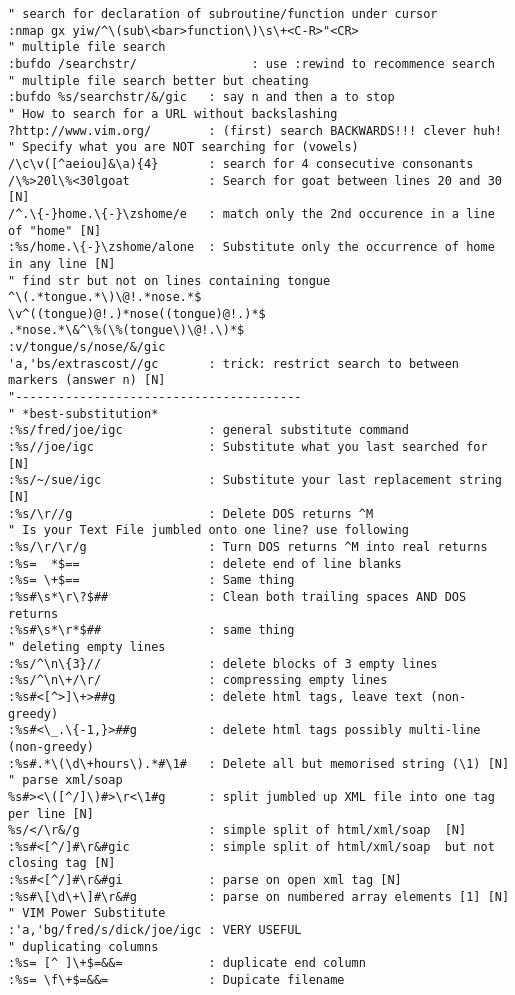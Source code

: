 \documentclass[10pt,landscape]{article}
\begin{document}
\begin{multicols}{2}
\begin{verbatim}
" search for declaration of subroutine/function under cursor
:nmap gx yiw/^\(sub\<bar>function\)\s\+<C-R>"<CR>
" multiple file search
:bufdo /searchstr/                : use :rewind to recommence search
" multiple file search better but cheating
:bufdo %s/searchstr/&/gic   : say n and then a to stop
" How to search for a URL without backslashing
?http://www.vim.org/        : (first) search BACKWARDS!!! clever huh!
" Specify what you are NOT searching for (vowels)
/\c\v([^aeiou]&\a){4}       : search for 4 consecutive consonants
/\%>20l\%<30lgoat           : Search for goat between lines 20 and 30 [N]
/^.\{-}home.\{-}\zshome/e   : match only the 2nd occurence in a line of "home" [N]
:%s/home.\{-}\zshome/alone  : Substitute only the occurrence of home in any line [N]
" find str but not on lines containing tongue
^\(.*tongue.*\)\@!.*nose.*$
\v^((tongue)@!.)*nose((tongue)@!.)*$
.*nose.*\&^\%(\%(tongue\)\@!.\)*$ 
:v/tongue/s/nose/&/gic
'a,'bs/extrascost//gc       : trick: restrict search to between markers (answer n) [N]
"----------------------------------------
" *best-substitution*
:%s/fred/joe/igc            : general substitute command
:%s//joe/igc                : Substitute what you last searched for [N]
:%s/~/sue/igc               : Substitute your last replacement string [N]
:%s/\r//g                   : Delete DOS returns ^M
" Is your Text File jumbled onto one line? use following
:%s/\r/\r/g                 : Turn DOS returns ^M into real returns
:%s=  *$==                  : delete end of line blanks
:%s= \+$==                  : Same thing
:%s#\s*\r\?$##              : Clean both trailing spaces AND DOS returns
:%s#\s*\r*$##               : same thing
" deleting empty lines
:%s/^\n\{3}//               : delete blocks of 3 empty lines
:%s/^\n\+/\r/               : compressing empty lines
:%s#<[^>]\+>##g             : delete html tags, leave text (non-greedy)
:%s#<\_.\{-1,}>##g          : delete html tags possibly multi-line (non-greedy)
:%s#.*\(\d\+hours\).*#\1#   : Delete all but memorised string (\1) [N]
" parse xml/soap 
%s#><\([^/]\)#>\r<\1#g      : split jumbled up XML file into one tag per line [N]
%s/</\r&/g                  : simple split of html/xml/soap  [N]
:%s#<[^/]#\r&#gic           : simple split of html/xml/soap  but not closing tag [N]
:%s#<[^/]#\r&#gi            : parse on open xml tag [N]
:%s#\[\d\+\]#\r&#g          : parse on numbered array elements [1] [N]
" VIM Power Substitute
:'a,'bg/fred/s/dick/joe/igc : VERY USEFUL
" duplicating columns
:%s= [^ ]\+$=&&=            : duplicate end column
:%s= \f\+$=&&=              : Dupicate filename

\end{verbatim}
\end{multicols}
\end{document}
